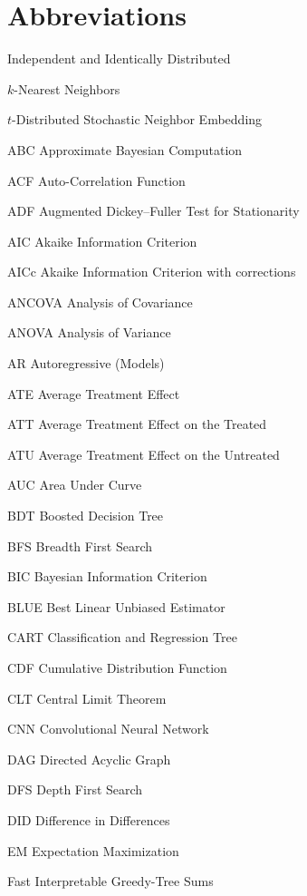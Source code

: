 \clearpage
\section*{Abbreviations}

\begin{symbollist}
  \item[\iid] Independent and Identically Distributed
  \item[\kNN] $k$-Nearest Neighbors
  \item[\tSNE] $t$-Distributed Stochastic Neighbor Embedding
  \item[ABC] Approximate Bayesian Computation
  \item[ACF] Auto-Correlation Function
  \item[ADF] Augmented Dickey--Fuller Test for Stationarity
  \item[AIC] Akaike Information Criterion
  \item[AICc] Akaike Information Criterion with corrections
  \item[ANCOVA] Analysis of Covariance
  \item[ANOVA] Analysis of Variance
  \item[AR] Autoregressive (Models)
  \item[ATE] Average Treatment Effect
  \item[ATT] Average Treatment Effect on the Treated
  \item[ATU] Average Treatment Effect on the Untreated
  \item[AUC] Area Under Curve
  \item[BDT] Boosted Decision Tree
  \item[BFS] Breadth First Search
  \item[BIC] Bayesian Information Criterion
  \item[BLUE] Best Linear Unbiased Estimator
  \item[CART] Classification and Regression Tree
  \item[CDF] Cumulative Distribution Function
  \item[CLT] Central Limit Theorem
  \item[CNN] Convolutional Neural Network
  \item[DAG] Directed Acyclic Graph
  \item[DFS] Depth First Search
  \item[DID] Difference in Differences
  \item[EM] Expectation Maximization
  \item[\figs] Fast Interpretable Greedy-Tree Sums

\end{symbollist}
